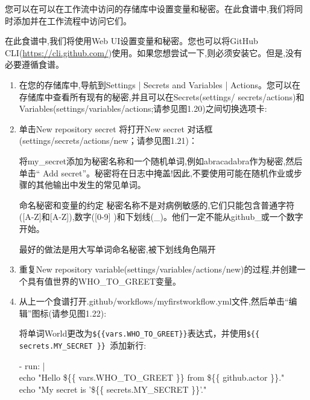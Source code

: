 
您可以在可以在工作流中访问的存储库中设置变量和秘密。在此食谱中,我们将同时添加并在工作流程中访问它们。


在此食谱中,我们将使用Web UI设置变量和秘密。您也可以将GitHub CLI(\url{https://cli.github.com/})使用。如果您想尝试一下,则必须安装它。但是,没有必要遵循食谱。


\begin{enumerate}
\item 
在您的存储库中,导航到Settings | Secrets and Variables | Actions。您可以在存储库中查看所有现有的秘密,并且可以在Secrets(settings/
secrets/actions)和Variables(settings/variables/actions;请参见图1.20)之间切换选项卡:


\item 
单击New repository secret 将打开New secret 对话框(settings/secrets/actions/new；请参见图1.21)：


将my\_secret添加为秘密名称和一个随机单词,例如abracadabra作为秘密,然后单击“ Add secret”。秘密将在日志中掩盖!因此,不要使用可能在随机作业或步骤的其他输出中发生的常见单词。

\begin{myTip}{命名秘密和变量的约定}
秘密名称不是对病例敏感的,它们只能包含普通字符([A-Z]和[A-Z]),数字([0-9] )和下划线(\_)。他们一定不能从github\_或一个数字开始。

最好的做法是用大写单词命名秘密,被下划线角色隔开
\end{myTip}

\item 
重复New repository variable(settings/variables/actions/new)的过程,并创建一个具有值世界的WHO\_TO\_GREET变量。

\item 
从上一个食谱打开.github/workflows/myfirstworkflow.yml文件,然后单击“编辑”图标(请参见图1.22):


将单词World更改为\verb|${{vars.WHO_TO_GREET}}|表达式，并使用\verb|${{ secrets.MY_SECRET }} |添加新行:

\begin{tcolorbox}[ breakable,colback = bashcodebg, colframe= black!50!white]
\scriptsize{
- run: | \\
\hspace*{2em}echo "Hello \$\{\{ vars.WHO\_TO\_GREET \}\}  from \$\{\{ github.actor \}\}." \\
\hspace*{2em}echo "My secret is  '\$\{\{ secrets.MY\_SECRET \}\}'."
}
\end{tcolorbox}


\end{enumerate}
